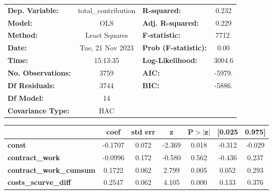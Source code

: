 \begin{center}
\begin{tabular}{lclc}
\toprule
\textbf{Dep. Variable:}                     & total\_contribution & \textbf{  R-squared:         } &     0.232   \\
\textbf{Model:}                             &         OLS         & \textbf{  Adj. R-squared:    } &     0.229   \\
\textbf{Method:}                            &    Least Squares    & \textbf{  F-statistic:       } &     7712.   \\
\textbf{Date:}                              &   Tue, 21 Nov 2023  & \textbf{  Prob (F-statistic):} &     0.00    \\
\textbf{Time:}                              &       15:13:35      & \textbf{  Log-Likelihood:    } &    3004.6   \\
\textbf{No. Observations:}                  &          3759       & \textbf{  AIC:               } &    -5979.   \\
\textbf{Df Residuals:}                      &          3744       & \textbf{  BIC:               } &    -5886.   \\
\textbf{Df Model:}                          &            14       & \textbf{                     } &             \\
\textbf{Covariance Type:}                   &         HAC         & \textbf{                     } &             \\
\bottomrule
\end{tabular}
\begin{tabular}{lcccccc}
                                            & \textbf{coef} & \textbf{std err} & \textbf{z} & \textbf{P$> |$z$|$} & \textbf{[0.025} & \textbf{0.975]}  \\
\midrule
\textbf{const}                              &      -0.1707  &        0.072     &    -2.369  &         0.018        &       -0.312    &       -0.029     \\
\textbf{contract\_work}                     &      -0.0996  &        0.172     &    -0.580  &         0.562        &       -0.436    &        0.237     \\
\textbf{contract\_work\_cumsum}             &       0.1722  &        0.062     &     2.799  &         0.005        &        0.052    &        0.293     \\
\textbf{costs\_scurve\_diff}                &       0.2547  &        0.062     &     4.105  &         0.000        &        0.133    &        0.376     \\

\end{tabular}
\end{center}
